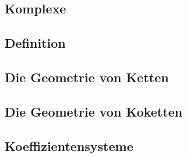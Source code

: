 \subsection{Komplexe}
\subsection{Definition}
\subsection{Die Geometrie von Ketten}
\subsection{Die Geometrie von Koketten}
\subsection{Koeffizientensysteme}
